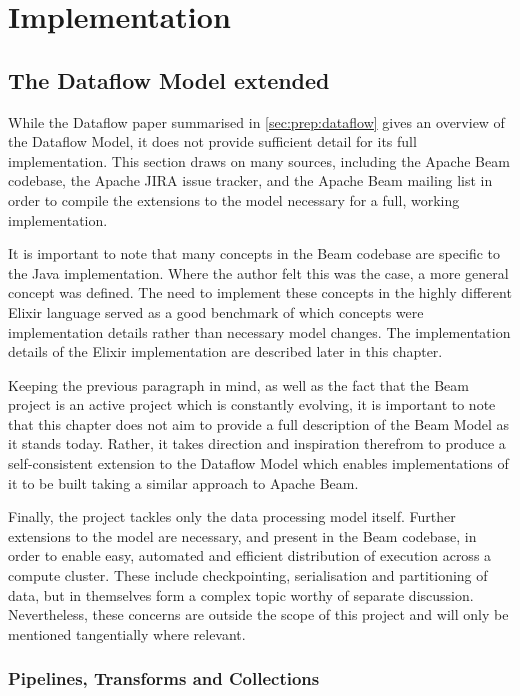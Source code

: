 \chapter{Implementation}\label{ch:impl}

\section{The Dataflow Model extended}\label{sec:impl:dataflow}

While the Dataflow paper \cite{Akidau:2015} summarised in \cref{sec:prep:dataflow} gives an overview of the Dataflow Model, it does not provide sufficient detail for its full implementation.
This section draws on many sources, including the Apache Beam codebase, the Apache JIRA issue tracker, and the Apache Beam mailing list in order to compile the extensions to the model necessary for a full, working implementation.

It is important to note that many concepts in the Beam codebase are specific to the Java implementation.
Where the author felt this was the case, a more general concept was defined.
The need to implement these concepts in the highly different Elixir language served as a good benchmark of which concepts were implementation details rather than necessary model changes.
The implementation details of the Elixir implementation are described later in this chapter.

Keeping the previous paragraph in mind, as well as the fact that the Beam project is an active project which is constantly evolving, it is important to note that this chapter does not aim to provide a full description of the Beam Model as it stands today.
Rather, it takes direction and inspiration therefrom to produce a self-consistent extension to the Dataflow Model which enables implementations of it to be built taking a similar approach to Apache Beam.

Finally, the project tackles only the data processing model itself.
Further extensions to the model are necessary, and present in the Beam codebase, in order to enable easy, automated and efficient distribution of execution across a compute cluster.
These include checkpointing, serialisation and partitioning of data, but in themselves form a complex topic worthy of separate discussion.
Nevertheless, these concerns are outside the scope of this project and will only be mentioned tangentially where relevant.

\subsection{Pipelines, Transforms and Collections}

